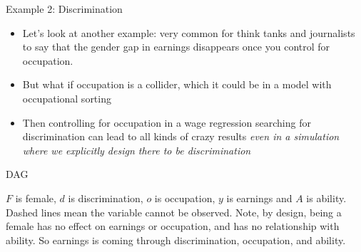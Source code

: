 \documentclass{beamer}
\begin{document}
\begin{frame}{Example 2: Discrimination}

  \begin{itemize}
    \item Let's look at another example: very common for think tanks and journalists to say that the gender gap in earnings disappears once you control for occupation.
    \item But what if occupation is a collider, which it could be in a model with occupational sorting
    \item Then controlling for occupation in a wage regression searching for discrimination can lead to all kinds of crazy results \emph{even in a simulation where we explicitly design there to be discrimination}
  \end{itemize}

\end{frame}

\begin{frame}{DAG}

  \begin{center}
  \end{center}

  $F$ is female, $d$ is discrimination, $o$ is occupation, $y$ is earnings and $A$ is ability. Dashed lines mean the variable cannot be observed. Note, by design, being a female has no effect on earnings or occupation, and has no relationship with ability. So earnings is coming through discrimination, occupation, and ability.

\end{frame}
\end{document}
